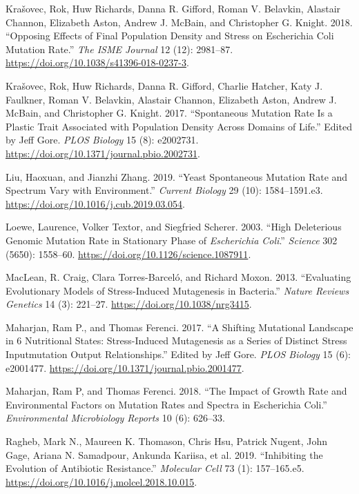 \documentclass[
  12pt,
  letterpaper,
  DIV=11,
  numbers=noendperiod]{scrreprt}
\newlength{\cslhangindent}
\newlength{\cslentryspacingunit} %
\newenvironment{CSLReferences}[2] %
 {%
  \setlength{\parindent}{0pt}
  \ifodd #1
  \let\oldpar\par
  \def\par{\hangindent=\cslhangindent\oldpar}
  \fi
  \setlength{\parskip}{#2\cslentryspacingunit}
 }%
 {}
\begin{document}
\begin{CSLReferences}{1}{0}
\leavevmode{}%
Krašovec, Rok, Huw Richards, Danna R. Gifford, Roman V. Belavkin,
Alastair Channon, Elizabeth Aston, Andrew J. McBain, and Christopher G.
Knight. 2018. {``Opposing Effects of Final Population Density and Stress
on Escherichia Coli Mutation Rate.''} \emph{The ISME Journal} 12 (12):
2981--87. \url{https://doi.org/10.1038/s41396-018-0237-3}.

\leavevmode{}%
Krašovec, Rok, Huw Richards, Danna R. Gifford, Charlie Hatcher, Katy J.
Faulkner, Roman V. Belavkin, Alastair Channon, Elizabeth Aston, Andrew
J. McBain, and Christopher G. Knight. 2017. {``Spontaneous Mutation Rate
Is a Plastic Trait Associated with Population Density Across Domains of
Life.''} Edited by Jeff Gore. \emph{PLOS Biology} 15 (8): e2002731.
\url{https://doi.org/10.1371/journal.pbio.2002731}.

\leavevmode{}%
Liu, Haoxuan, and Jianzhi Zhang. 2019. {``Yeast Spontaneous Mutation
Rate and Spectrum Vary with Environment.''} \emph{Current Biology} 29
(10): 1584--1591.e3. \url{https://doi.org/10.1016/j.cub.2019.03.054}.

\leavevmode{}%
Loewe, Laurence, Volker Textor, and Siegfried Scherer. 2003. {``High
Deleterious Genomic Mutation Rate in Stationary Phase of
{\emph{Escherichia Coli}}.''} \emph{Science} 302 (5650): 1558--60.
\url{https://doi.org/10.1126/science.1087911}.

\leavevmode{}%
MacLean, R. Craig, Clara Torres-Barceló, and Richard Moxon. 2013.
{``Evaluating Evolutionary Models of Stress-Induced Mutagenesis in
Bacteria.''} \emph{Nature Reviews Genetics} 14 (3): 221--27.
\url{https://doi.org/10.1038/nrg3415}.

\leavevmode{}%
Maharjan, Ram P., and Thomas Ferenci. 2017. {``A Shifting Mutational
Landscape in 6 Nutritional States: Stress-Induced Mutagenesis as a
Series of Distinct Stress Input{\textendash}mutation Output
Relationships.''} Edited by Jeff Gore. \emph{PLOS Biology} 15 (6):
e2001477. \url{https://doi.org/10.1371/journal.pbio.2001477}.

\leavevmode{}%
Maharjan, Ram P, and Thomas Ferenci. 2018. {``The Impact of Growth Rate
and Environmental Factors on Mutation Rates and Spectra in Escherichia
Coli.''} \emph{Environmental Microbiology Reports} 10 (6): 626--33.

\leavevmode{}%
Ragheb, Mark N., Maureen K. Thomason, Chris Hsu, Patrick Nugent, John
Gage, Ariana N. Samadpour, Ankunda Kariisa, et al. 2019. {``Inhibiting
the Evolution of Antibiotic Resistance.''} \emph{Molecular Cell} 73 (1):
157--165.e5. \url{https://doi.org/10.1016/j.molcel.2018.10.015}.

\end{CSLReferences}
\end{document}
